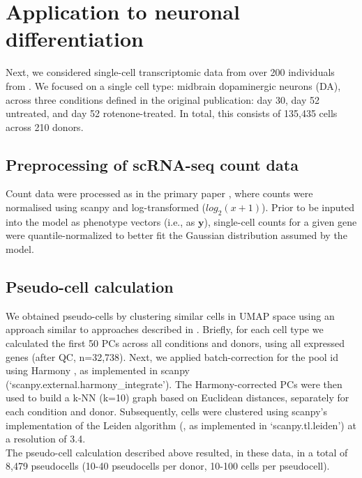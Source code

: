 \section{Application to neuronal differentiation}\label{sec:neuroseq}

Next, we considered single-cell transcriptomic data from over 200 individuals from \cite{jerber2020population}.
We focused on a single cell type: midbrain dopaminergic neurons (DA), across three conditions defined in the original publication: day 30, day 52 untreated, and day 52 rotenone-treated. 
In total, this consists of 135,435 cells across 210 donors.


\subsection{Preprocessing of scRNA-seq count data}
Count data were processed as in the primary paper \cite{jerber2020population}, where counts were normalised using scanpy \cite{wolf2018scanpy} and log-transformed ($log_2(x+1)$).
Prior to be inputed into the model as phenotype vectors (i.e., as $\mathbf{y}$), single-cell counts for a given gene were quantile-normalized to better fit the Gaussian distribution assumed by the model.


\subsection{Pseudo-cell calculation}

We obtained pseudo-cells by clustering similar cells in UMAP space using an approach similar to approaches described in \cite{baran2019metacell, detomaso2019functional}. 
Briefly, for each cell type we calculated the first 50 PCs across all conditions and donors, using all expressed genes (after QC, n=32,738). 
Next, we applied batch-correction for the pool id using Harmony \cite{korsunsky2019fast}, as implemented in scanpy (`scanpy.external.harmony\_integrate'). 
The Harmony-corrected PCs were then used to build a k-NN (k=10) graph based on Euclidean distances, separately for each condition and donor. 
Subsequently, cells were clustered using scanpy’s implementation of the Leiden algorithm (\cite{traag2019louvain}, as implemented in `scanpy.tl.leiden') at a resolution of 3.4. \\

The pseudo-cell calculation described above resulted, in these data, in a total of 8,479 pseudocells (10-40 pseudocells per donor, 10-100 cells per pseudocell).

